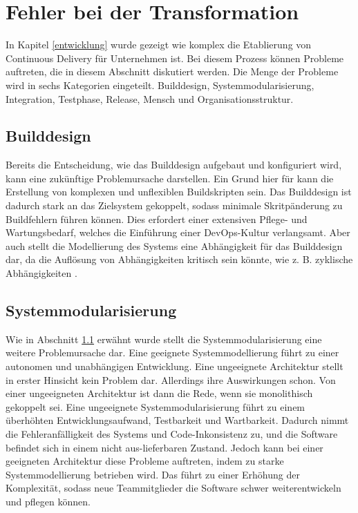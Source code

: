 \section{Fehler bei der Transformation} \label{Fehler bei der Transformation}

In Kapitel \ref{entwicklung} wurde gezeigt wie komplex die Etablierung von Continuous Delivery für Unternehmen ist. Bei diesem Prozess können Probleme auftreten, die in diesem Abschnitt diskutiert werden. Die Menge der Probleme wird in sechs Kategorien eingeteilt. Builddesign, Systemmodularisierung, Integration, Testphase, Release, Mensch und Organisationsstruktur.

\subsection{Builddesign} \label{builddesgin}
Bereits die Entscheidung, wie das Builddesign aufgebaut und konfiguriert wird, kann eine zukünftige Problemursache darstellen. Ein Grund hier für kann die Erstellung von komplexen und unflexiblen Buildskripten sein. Das Builddesign ist dadurch stark an das Zielsystem gekoppelt, sodass minimale Skritpänderung zu Buildfehlern führen können. Dies erfordert einer extensiven Pflege- und Wartungsbedarf, welches die Einführung einer DevOps-Kultur verlangsamt. Aber auch stellt die Modellierung des Systems eine Abhängigkeit für das Builddesign dar, da die Auflösung von Abhängigkeiten kritisch sein könnte, wie z. B. zyklische Abhängigkeiten \cite{Laukkanen.2017}.

\subsection{Systemmodularisierung}  \label{Systemmodularisierung}
Wie in Abschnitt \ref{builddesgin} erwähnt wurde stellt die Systemmodularisierung eine weitere Problemursache dar. Eine geeignete Systemmodellierung führt zu einer autonomen und unabhängigen Entwicklung. Eine ungeeignete Architektur stellt in erster Hinsicht kein Problem dar. Allerdings ihre Auswirkungen schon. Von einer ungeeigneten Architektur ist dann die Rede, wenn sie monolithisch gekoppelt sei. Eine ungeeignete Systemmodularisierung führt zu einem überhöhten Entwicklungsaufwand, Testbarkeit und Wartbarkeit. Dadurch nimmt die Fehleranfälligkeit des Systems und Code-Inkonsistenz zu, und die Software befindet sich in einem nicht aus-lieferbaren Zustand. Jedoch kann bei einer geeigneten Architektur diese Probleme auftreten, indem zu starke Systemmodellierung betrieben wird. Das führt zu einer Erhöhung der Komplexität, sodass neue Teammitglieder die Software schwer weiterentwickeln und pflegen können.

